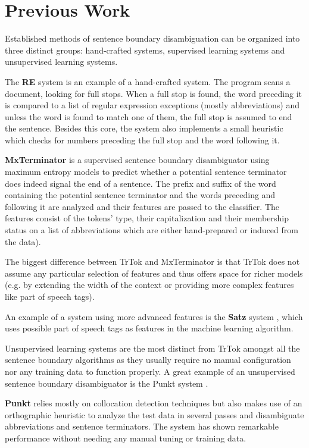 \section{Previous Work}
\label{sec:previous-work}

Established methods of sentence boundary disambiguation can be
organized into three distinct groups: hand-crafted systems, supervised
learning systems and unsupervised learning systems.

The \textbf{RE} system \cite{sbd-re} is an example of a hand-crafted
system. The program scans a document, looking for full stops. When a
full stop is found, the word preceding it is compared to a list of
regular expression exceptions (mostly abbreviations) and unless the
word is found to match one of them, the full stop is assumed to end
the sentence. Besides this core, the system also implements a small
heuristic which checks for numbers preceding the full stop and the
word following it.

\textbf{MxTerminator} \cite{sbd-mxterm} is a supervised sentence
boundary disambiguator using maximum entropy models to predict whether
a potential sentence terminator does indeed signal the end of a
sentence. The prefix and suffix of the word containing the potential
sentence terminator and the words preceding and following it are
analyzed and their features are passed to the classifier. The features
consist of the tokens' type, their capitalization and their membership
status on a list of abbreviations which are either hand-prepared or
induced from the data).

The biggest difference between TrTok and MxTerminator is that TrTok
does not assume any particular selection of features and thus offers
space for richer models (e.g. by extending the width of the context or
providing more complex features like part of speech tags).

An example of a system using more advanced features is the
\textbf{Satz} system \cite{sbd-satz}, which uses possible part of
speech tags as features in the machine learning algorithm.

Unsupervised learning systems are the most distinct from TrTok amongst
all the sentence boundary algorithms as they usually require no manual
configuration nor any training data to function properly. A great
example of an unsupervised sentence boundary disambiguator is the
Punkt system \cite{sbd-punkt}.

\textbf{Punkt} relies mostly on collocation detection techniques but
also makes use of an orthographic heuristic to analyze the test data
in several passes and disambiguate abbreviations and sentence
terminators. The system has shown remarkable performance without
needing any manual tuning or training data.
